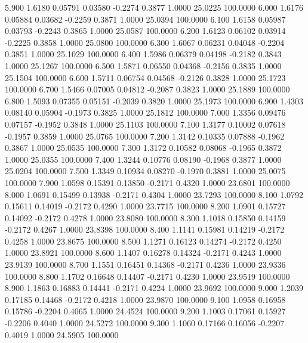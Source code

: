    5.900   1.6180   0.05791   0.03580  -0.2274   0.3877   1.0000  25.0225 100.0000
   6.000   1.6176   0.05884   0.03682  -0.2259   0.3871   1.0000  25.0394 100.0000
   6.100   1.6158   0.05987   0.03793  -0.2243   0.3865   1.0000  25.0587 100.0000
   6.200   1.6123   0.06102   0.03914  -0.2225   0.3858   1.0000  25.0800 100.0000
   6.300   1.6067   0.06231   0.04048  -0.2204   0.3851   1.0000  25.1029 100.0000
   6.400   1.5986   0.06379   0.04198  -0.2182   0.3843   1.0000  25.1267 100.0000
   6.500   1.5871   0.06550   0.04368  -0.2156   0.3835   1.0000  25.1504 100.0000
   6.600   1.5711   0.06754   0.04568  -0.2126   0.3828   1.0000  25.1723 100.0000
   6.700   1.5466   0.07005   0.04812  -0.2087   0.3823   1.0000  25.1889 100.0000
   6.800   1.5093   0.07355   0.05151  -0.2039   0.3820   1.0000  25.1973 100.0000
   6.900   1.4303   0.08140   0.05904  -0.1973   0.3825   1.0000  25.1812 100.0000
   7.000   1.3356   0.09476   0.07157  -0.1952   0.3848   1.0000  25.1103 100.0000
   7.100   1.3177   0.10002   0.07618  -0.1957   0.3859   1.0000  25.0765 100.0000
   7.200   1.3142   0.10335   0.07888  -0.1962   0.3867   1.0000  25.0535 100.0000
   7.300   1.3172   0.10582   0.08068  -0.1965   0.3872   1.0000  25.0355 100.0000
   7.400   1.3244   0.10776   0.08190  -0.1968   0.3877   1.0000  25.0204 100.0000
   7.500   1.3349   0.10934   0.08270  -0.1970   0.3881   1.0000  25.0075 100.0000
   7.900   1.0598   0.15391   0.13850  -0.2171   0.4320   1.0000  23.6801 100.0000
   8.000   1.0691   0.15499   0.13938  -0.2171   0.4304   1.0000  23.7293 100.0000
   8.100   1.0792   0.15611   0.14019  -0.2172   0.4290   1.0000  23.7715 100.0000
   8.200   1.0901   0.15727   0.14092  -0.2172   0.4278   1.0000  23.8080 100.0000
   8.300   1.1018   0.15850   0.14159  -0.2172   0.4267   1.0000  23.8398 100.0000
   8.400   1.1141   0.15981   0.14219  -0.2172   0.4258   1.0000  23.8675 100.0000
   8.500   1.1271   0.16123   0.14274  -0.2172   0.4250   1.0000  23.8921 100.0000
   8.600   1.1407   0.16278   0.14324  -0.2171   0.4243   1.0000  23.9139 100.0000
   8.700   1.1551   0.16451   0.14368  -0.2171   0.4236   1.0000  23.9336 100.0000
   8.800   1.1702   0.16648   0.14407  -0.2171   0.4230   1.0000  23.9519 100.0000
   8.900   1.1863   0.16883   0.14441  -0.2171   0.4224   1.0000  23.9692 100.0000
   9.000   1.2039   0.17185   0.14468  -0.2172   0.4218   1.0000  23.9870 100.0000
   9.100   1.0958   0.16958   0.15786  -0.2204   0.4065   1.0000  24.4524 100.0000
   9.200   1.1003   0.17061   0.15927  -0.2206   0.4040   1.0000  24.5272 100.0000
   9.300   1.1060   0.17166   0.16056  -0.2207   0.4019   1.0000  24.5905 100.0000
